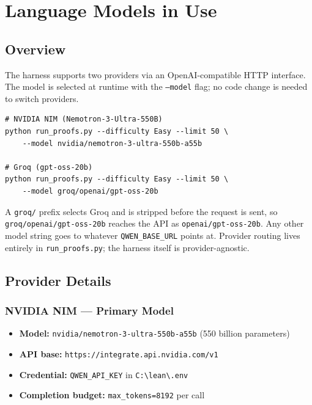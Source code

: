 \chapter{Language Models in Use}
\label{chap:llm_in_use}

\section{Overview}

The harness supports two providers via an OpenAI-compatible HTTP interface.
The model is selected at runtime with the \texttt{--model} flag; no code
change is needed to switch providers.

\begin{verbatim}
# NVIDIA NIM (Nemotron-3-Ultra-550B)
python run_proofs.py --difficulty Easy --limit 50 \
    --model nvidia/nemotron-3-ultra-550b-a55b

# Groq (gpt-oss-20b)
python run_proofs.py --difficulty Easy --limit 50 \
    --model groq/openai/gpt-oss-20b
\end{verbatim}

A \texttt{groq/} prefix selects Groq and is stripped before the request is
sent, so \texttt{groq/openai/gpt-oss-20b} reaches the API as
\texttt{openai/gpt-oss-20b}. Any other model string goes to whatever
\texttt{QWEN\_BASE\_URL} points at. Provider routing lives entirely in
\texttt{run\_proofs.py}; the harness itself is provider-agnostic.

\section{Provider Details}

\subsection{NVIDIA NIM --- Primary Model}

\begin{itemize}
  \item \textbf{Model:} \texttt{nvidia/nemotron-3-ultra-550b-a55b} (550 billion parameters)
  \item \textbf{API base:} \texttt{https://integrate.api.nvidia.com/v1}
  \item \textbf{Credential:} \texttt{QWEN\_API\_KEY} in \texttt{C:\textbackslash lean\textbackslash .env}
  \item \textbf{Completion budget:} \texttt{max\_tokens=8192} per call
\end{itemize}

